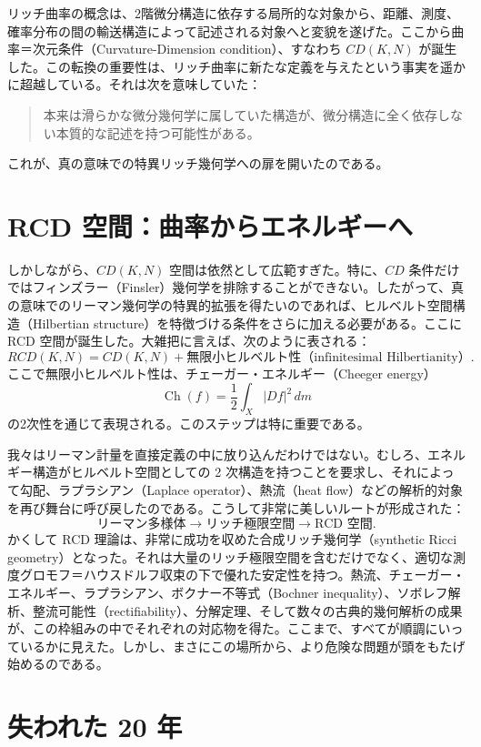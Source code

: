 \documentclass[lualatex]{ltjsarticle}
\begin{document}
リッチ曲率の概念は、2階微分構造に依存する局所的な対象から、距離、測度、確率分布の間の輸送構造によって記述される対象へと変貌を遂げた。ここから曲率＝次元条件（Curvature-Dimension condition）、すなわち $CD(K,N)$ が誕生した。この転換の重要性は、リッチ曲率に新たな定義を与えたという事実を遥かに超越している。それは次を意味していた：

\begin{quote}
本来は滑らかな微分幾何学に属していた構造が、微分構造に全く依存しない本質的な記述を持つ可能性がある。
\end{quote}

これが、真の意味での特異リッチ幾何学への扉を開いたのである。

\section{RCD 空間：曲率からエネルギーへ}

しかしながら、$CD(K,N)$ 空間は依然として広範すぎた。特に、$CD$ 条件だけではフィンズラー（Finsler）幾何学を排除することができない。したがって、真の意味でのリーマン幾何学の特異的拡張を得たいのであれば、ヒルベルト空間構造（Hilbertian structure）を特徴づける条件をさらに加える必要がある。ここに RCD 空間が誕生した。大雑把に言えば、次のように表される：
\[
    RCD(K,N) = CD(K,N) + \text{無限小ヒルベルト性（infinitesimal Hilbertianity）}.
\]
ここで無限小ヒルベルト性は、チェーガー・エネルギー（Cheeger energy）
\[
    \operatorname{Ch}(f) = \frac{1}{2} \int_X |Df|^2 \, dm
\]
の2次性を通じて表現される。このステップは特に重要である。

我々はリーマン計量を直接定義の中に放り込んだわけではない。むしろ、エネルギー構造がヒルベルト空間としての 2 次構造を持つことを要求し、それによって勾配、ラプラシアン（Laplace operator）、熱流（heat flow）などの解析的対象を再び舞台に呼び戻したのである。こうして非常に美しいルートが形成された：
\[
    \text{リーマン多様体} \longrightarrow \text{リッチ極限空間} \longrightarrow \text{RCD 空間}.
\]
かくして RCD 理論は、非常に成功を収めた合成リッチ幾何学（synthetic Ricci geometry）となった。それは大量のリッチ極限空間を含むだけでなく、適切な測度グロモフ＝ハウスドルフ収束の下で優れた安定性を持つ。熱流、チェーガー・エネルギー、ラプラシアン、ボクナー不等式（Bochner inequality）、ソボレフ解析、整流可能性（rectifiability）、分解定理、そして数々の古典的幾何解析の成果が、この枠組みの中でそれぞれの対応物を得た。ここまで、すべてが順調にいっているかに見えた。しかし、まさにこの場所から、より危険な問題が頭をもたげ始めるのである。

\section{失われた 20 年}
\end{document}

